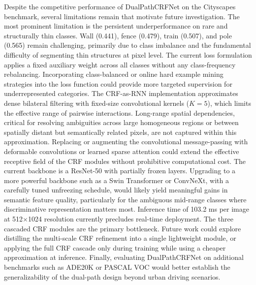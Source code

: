 \documentclass[conference]{IEEEtran}
\begin{document}
Despite the competitive performance of DualPathCRFNet on the Cityscapes benchmark, several
limitations remain that motivate future investigation. The most prominent limitation is the persistent
underperformance on rare and structurally thin classes. Wall (0.441), fence (0.479), train (0.507), and pole
(0.565) remain challenging, primarily due to class imbalance and the fundamental difficulty of segmenting
thin structures at pixel level. The current loss formulation applies a fixed auxiliary weight across all classes
without any class-frequency rebalancing. Incorporating class-balanced or online hard example mining
strategies into the loss function could provide more targeted supervision for underrepresented categories.
The CRF-as-RNN implementation approximates dense bilateral filtering with fixed-size convolutional
kernels ($K=5$), which limits the effective range of pairwise interactions. Long-range spatial dependencies, critical for resolving ambiguities across large homogeneous regions or between spatially distant but
semantically related pixels, are not captured within this approximation. Replacing or augmenting the
convolutional message-passing with deformable convolutions or learned sparse attention could extend the
effective receptive field of the CRF modules without prohibitive computational cost. The current backbone
is a ResNet-50 with partially frozen layers. Upgrading to a more powerful backbone such as a Swin
Transformer or ConvNeXt, with a carefully tuned unfreezing schedule, would likely yield meaningful
gains in semantic feature quality, particularly for the ambiguous mid-range classes where discriminative
representation matters most. Inference time of 103.2 ms per image at 512$\times$1024 resolution currently
precludes real-time deployment. The three cascaded CRF modules are the primary bottleneck. Future work
could explore distilling the multi-scale CRF refinement into a single lightweight module, or applying the
full CRF cascade only during training while using a cheaper approximation at inference. Finally,
evaluating DualPathCRFNet on additional benchmarks such as ADE20K or PASCAL VOC would better
establish the generalizability of the dual-path design beyond urban driving scenarios.
\end{document}
